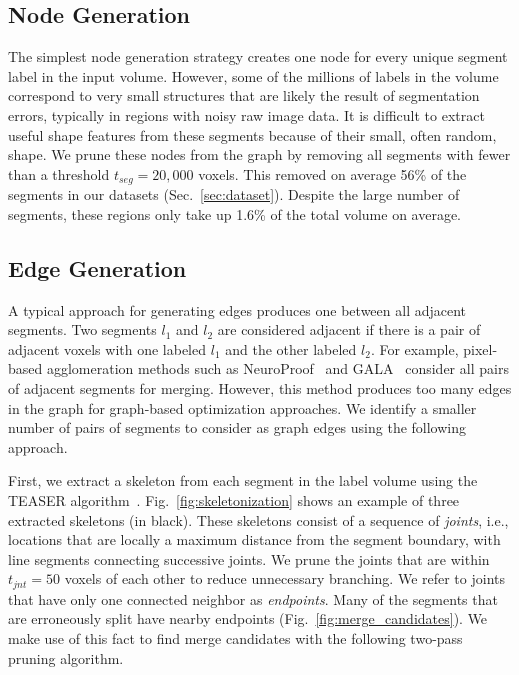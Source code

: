 

\subsection{Node Generation}
\label{sec:skeletonization}

The simplest node generation strategy creates one node for every unique segment label in the input volume. However, some of the millions of labels in the volume correspond to very small structures that are likely the result of segmentation errors, typically in regions with noisy raw image data. It is difficult to extract useful shape features from these segments because of their small, often random, shape. We prune these nodes from the graph by removing all segments with fewer than a threshold $t_{seg} = 20,000$ voxels. This removed on average 56\% of the segments in our  datasets (Sec.~\ref{sec:dataset}). Despite the large number of segments, these regions only take up 1.6\% of the total volume on average.

\subsection{Edge Generation}

A typical approach for generating edges produces one between all adjacent segments. Two segments $l_1$ and $l_2$ are considered adjacent if there is a pair of adjacent voxels with one labeled $l_1$ and the other labeled $l_2$.
For example, pixel-based agglomeration methods such as NeuroProof~\cite{10.1371/journal.pone.0125825} and GALA~\cite{nunez2014graph} consider all pairs of adjacent segments for merging.
However, this method produces too many edges in the graph for graph-based optimization approaches. We identify a smaller number of pairs of segments to consider as graph edges using the following approach.

First, we extract a skeleton from each segment in the label volume using the TEASER algorithm~\cite{sato2000teasar,zhao2014automatic}. Fig.~\ref{fig:skeletonization} shows an example of three extracted skeletons (in black). These skeletons consist of a sequence of \textit{joints}, i.e., locations that are locally a maximum distance from the segment boundary, with line segments connecting successive joints. We prune the joints that are within $t_{jnt} = 50$ voxels of each other to reduce unnecessary branching. We refer to joints that have only one connected neighbor as \textit{endpoints}. Many of the segments that are erroneously split have nearby endpoints  (Fig.~\ref{fig:merge_candidates}). We make use of this fact to find merge candidates with the following two-pass pruning algorithm.

